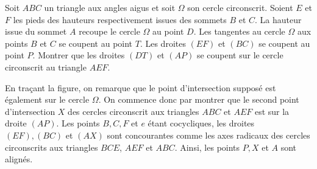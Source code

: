 \begin{exo}
Soit $ABC$ un triangle aux angles aigus et soit $\Omega$ son cercle circonscrit. Soient $E$ et $F$ les pieds des hauteurs respectivement issues des sommets $B$ et $C$. La hauteur issue du sommet $A$ recoupe le cercle $\Omega$ au point $D$. Les tangentes au cercle $\Omega$ aux points $B$ et $C$ se coupent au point $T$. Les droites $(EF)$ et $(BC)$ se coupent au point $P$. Montrer que les droites $(DT)$ et $(AP)$ se coupent sur le cercle circonscrit au triangle $AEF$.  
\end{exo}
\begin{sol}
%
%
%

En traçant la figure, on remarque que le point d'intersection supposé est également sur le cercle $\Omega$. On commence donc par montrer que le second point d'intersection $X$ des cercles circonscrit aux triangles $ABC$ et $AEF$ est sur la droite $(AP)$. Les points $B,C,F$ et $e$ étant cocycliques, les droites $(EF),(BC)$ et $(AX)$ sont concourantes comme les axes radicaux des cercles circonscrits aux triangles $BCE$, $AEF$ et $ABC$. Ainsi, les points $P,X$ et $A$ sont alignés. 


\end{sol}

